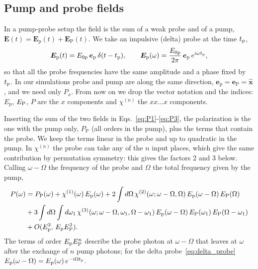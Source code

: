 \documentclass[10pt,a4paper]{paper}
\begin{document}
\subsection{Pump and probe fields}
\label{sec:theory_fields}

In a pump-probe setup the field is the sum of a weak probe and of a pump,
$\bm{E}(t) = \bm{E}_{\mathrm{p}}(t)+\bm{E}_{\mathrm{P}}(t)$. We take an impulsive (delta) probe at the time $t_{\mathrm{p}}$,
\begin{equation}
\bm{E}_{\mathrm{p}}(t) = E_{0\mathrm{p}}\,\bm{e}_{\mathrm{p}}\,\delta(t-t_{\mathrm{p}}) , \qquad
\bm{E}_{\mathrm{p}}(\omega) = \frac{E_{0\mathrm{p}}}{2\pi}\,\bm{e}_{\mathrm{p}}\,e^{i\omega t_{\mathrm{p}}} ,
\label{eq:delta_probe}
\end{equation}
so that all the probe frequencies have the same amplitude and a phase fixed by $t_{\mathrm{p}}$. In our simulations probe and
pump are along the same direction, $\bm{e}_{\mathrm{p}} = \bm{e}_{\mathrm{P}} = \hat{\bm{x}}$, and we need only $P_x$.
From now on we drop the vector notation and the indices: $E_{\mathrm{p}}$, $E_{\mathrm{P}}$, $P$ are the $x$ components and
$\chi^{(n)}$ the $xx\dots x$ components.

Inserting the sum of the two fields in Eqs.~\eqref{eq:P1}-\eqref{eq:P3}, the polarization is the one with the pump
only, $P_{\mathrm{P}}$ (all orders in the pump), plus the terms that contain the probe. We keep the terms linear in
the probe and up to quadratic in the pump. In $\chi^{(n)}$ the probe can take any of the $n$ input places, which give
the same contribution by permutation symmetry: this gives the factors 2 and 3 below. Calling $\omega-\Omega$ the
frequency of the probe and $\Omega$ the total frequency given by the pump,
\begin{align}
P(\omega) &= P_{\mathrm{P}}(\omega) + \chi^{(1)}(\omega)\,E_{\mathrm{p}}(\omega)
+ 2\int d\Omega\,\chi^{(2)}(\omega;\omega-\Omega,\Omega)\,E_{\mathrm{p}}(\omega-\Omega)\,E_{\mathrm{P}}(\Omega) \nonumber\\
&+ 3\int d\Omega\int d\omega_1\,\chi^{(3)}(\omega;\omega-\Omega,\omega_1,\Omega-\omega_1)\,
E_{\mathrm{p}}(\omega-\Omega)\,E_{\mathrm{P}}(\omega_1)\,E_{\mathrm{P}}(\Omega-\omega_1) \nonumber\\
&+ O(E_{\mathrm{p}}^2,\,E_{\mathrm{p}}E_{\mathrm{P}}^3) .
\label{eq:P_pp}
\end{align}
The terms of order $E_{\mathrm{p}}E_{\mathrm{P}}^n$ describe the probe photon at $\omega-\Omega$ that leaves at $\omega$ after
the exchange of $n$ pump photons; for the delta probe~\eqref{eq:delta_probe}
$E_{\mathrm{p}}(\omega-\Omega) = E_{\mathrm{p}}(\omega)\,e^{-i\Omega t_{\mathrm{p}}}$.
\end{document}
